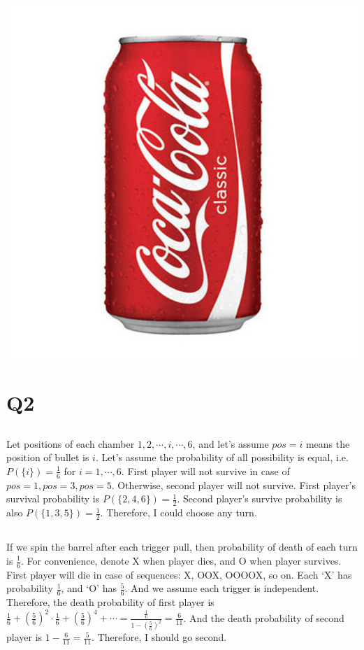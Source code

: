 \documentclass{article}
\begin{document}
\subsection{}
\begin{center}
    \includegraphics{./profile.jpg}
\end{center}

\section{Q2}

\subsection{}
Let positions of each chamber $1, 2, \cdots, i, \cdots, 6$,
and let's assume $pos=i$ means the position of bullet is $i$.
Let's assume the probability of all possibility is equal, i.e. $P(\{i\})=\frac{1}{6}$ for $i=1, \cdots, 6$.
First player will not survive in case of $pos=1, pos=3, pos=5$.
Otherwise, second player will not survive.
First player's survival probability is $P(\{2,4,6\})=\frac{1}{2}$.
Second player's survive probability is also $P(\{1,3,5\})=\frac{1}{2}$.
Therefore, I could choose any turn.

\subsection{}
If we spin the barrel after each trigger pull, then probability of death of each turn is $\frac{1}{6}$.
For convenience, denote X when player dies, and O when player survives.
First player will die in case of sequences: X, OOX, OOOOX, so on.
Each `X' has probability $\frac{1}{6}$, and `O' has $\frac{5}{6}$.
And we assume each trigger is independent.
Therefore, the death probability of first player is
$\frac{1}{6} + (\frac{5}{6})^{2}\cdot\frac{1}{6} + (\frac{5}{6})^{4} + \cdots
= \frac{\frac{1}{6}}{1 - (\frac{5}{6})^{2}} = \frac{6}{11}$.
And the death probability of second player is $1 - \frac{6}{11} = \frac{5}{11}$.
Therefore, I should go second.
\end{document}
